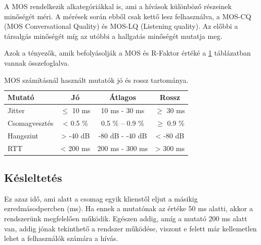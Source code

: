 
%

A MOS rendelkezik alkategóriákkal is, ami a hívások különböző részeinek minőségét méri. A 
mérések során ebből csak kettő lesz felhasználva, a MOS-CQ (MOS Conversational Quality) 
és MOS-LQ (Listening quality). Az előbbi a társalgás minőségét míg az utóbbi a hallgatás 
minőségét mutatja meg.

Azok a tényezők, amik befolyásolják a MOS és R-Faktor értéké a \ref{tab:values} 
táblázatban vannak összefoglalva. 

\begin{table}[H]
	\footnotesize
	\centering
	\begin{tabular}{ l c c c}
		\toprule
		Mutató & Jó & Átlagos & Rossz\\
		\midrule
		Jitter & $\leq$ 10 ms & 10 ms - 30 ms & $\geq$ 30 ms\\
		Csomagvesztés & < 0.5 \%  & 0.5 \% – 0.9 \% & $\geq$ 0.9 \%\\
		Hangszint & > -40 dB & -80 dB - -40 dB & < -80 dB\\
		RTT & < 200 ms & 200 ms - 300 ms & > 300 ms\\
		\bottomrule
	\end{tabular}
	\caption{MOS számításnál használt mutatók jó és rossz tartománya.}
	\label{tab:values}
\end{table}


\subsection{Késleltetés}

Ez azaz idő, ami alatt a csomag egyik klienstől eljut a másikig ezredmásodpercben (ms). 
Ha ennek a mutatónak az értéke 50 ms alatti, akkor a rendszerünk megfelelően működik. 
Egészen addig, amíg a mutató 200 ms alatt van, addig jónak tekinthető a rendszer 
működése, viszont e felett már kellemetlen lehet a felhasználók számára a hívás. 

